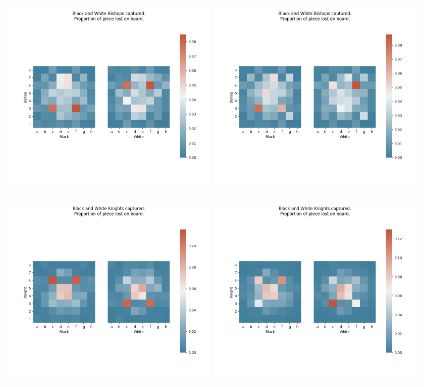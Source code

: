 \documentclass[11pt]{article}
\begin{document}
\begin{center}
\includegraphics[width=0.4\textwidth]{Images/_HEATMAP_Bishop_FISC.png}
\includegraphics[width=0.4\textwidth]{Images/_HEATMAP_Bishop_TOURNEMENTS.png}
\end{center}
\begin{center}
\includegraphics[width=0.4\textwidth]{Images/_HEATMAP_Knight_FISC.png}
\includegraphics[width=0.4\textwidth]{Images/_HEATMAP_Knight_TOURNEMENTS.png}
\end{center}
\end{document}
